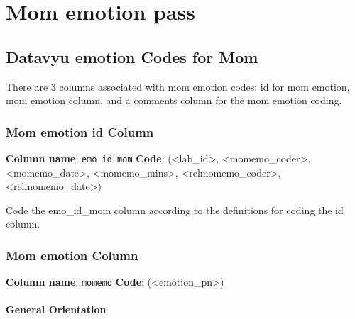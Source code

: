 \documentclass[
  12pt,
]{book}
\begin{document}
\hypertarget{mom-emotion-pass}{%
\section{Mom emotion pass}\label{mom-emotion-pass}}

\hypertarget{datavyu-emotion-codes-for-mom}{%
\subsection{Datavyu emotion Codes for Mom}\label{datavyu-emotion-codes-for-mom}}

There are 3 columns associated with mom emotion codes: id for mom emotion, mom emotion column, and a comments column for the mom emotion coding.

\hypertarget{mom-emotion-id-column}{%
\subsubsection*{Mom emotion id Column}\label{mom-emotion-id-column}}

\textbf{Column name}: \texttt{emo\_id\_mom}
\textbf{Code}: (\textless lab\_id\textgreater, \textless momemo\_coder\textgreater, \textless momemo\_date\textgreater, \textless momemo\_mins\textgreater, \textless relmomemo\_coder\textgreater, \textless relmomemo\_date\textgreater)

Code the emo\_id\_mom column according to the definitions for coding the id column.

\hypertarget{mom-emotion-column}{%
\subsubsection*{Mom emotion Column}\label{mom-emotion-column}}

\textbf{Column name}: \texttt{momemo}
\textbf{Code}: (\textless emotion\_pn\textgreater)

\hypertarget{general-orientation-1}{%
\paragraph*{General Orientation}\label{general-orientation-1}}
\end{document}
